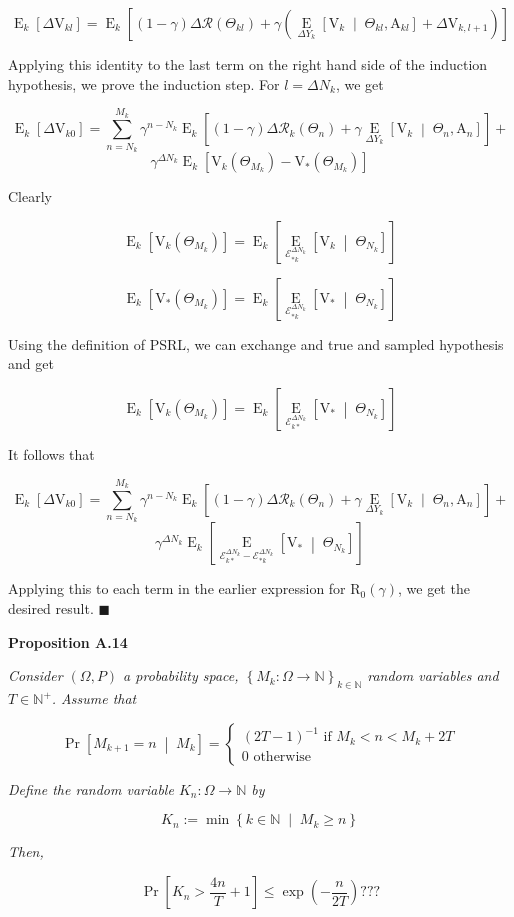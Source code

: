 \documentclass[a4paper]{article}
\newcommand{\Co}[1]{}
\newcommand{\AP}[1]{\left(#1\right)}
\newcommand{\AB}[1]{\left[#1\right]}
\newcommand{\AC}[1]{\left\{#1\right\}}
\newcommand{\ABM}[2]{\left[#1\;\middle\vert\;#2\right]}
\newcommand{\ACM}[2]{\left\{#1\;\middle\vert\;#2\right\}}
\newcommand{\Pa}[2]{\underset{#1}{\operatorname{Pr}}\AB{#2}}
\newcommand{\CP}[3]{\underset{#1}{\operatorname{Pr}}\ABM{#2}{#3}}
\newcommand{\CE}[3]{\underset{#1}{\operatorname{E}}\ABM{#2}{#3}}
\newcommand{\Nats}{\mathbb{N}}
\newcommand{\R}{\mathcal{R}}
\newcommand{\V}{\mathrm{V}}
\newcommand{\Reg}{\mathrm{R}}
\newcommand{\SHy}{Y}
\newcommand{\AT}{\mathrm{A}}
\newcommand{\Ev}{\mathcal{E}}
\newcommand{\ET}{N}
\newcommand{\IT}{M}
\newcommand{\TE}[1]{{\operatorname{E}_k}\AB{#1}}
\begin{document}
$$\TE{\Delta\V_{kl}}=\TE{(1-\gamma)\Delta\R\AP{\Theta_{kl}}+\gamma\AP{\CE{\Delta\SHy_k}{\V_k}{\Theta_{kl},\AT_{kl}}+\Delta\V_{k,l+1}}}$$

Applying this identity to the last term on the right hand side of the induction hypothesis, we prove the induction step. For $l=\Delta\ET_k$, we get

$$\TE{\Delta\V_{k0}}=\sum_{n=\ET_k}^{\IT_k}\gamma^{n-\ET_k}\TE{(1-\gamma)\Delta\R_k\AP{\Theta_n}+\gamma\CE{\Delta\SHy_k}{\V_{k}}{\Theta_n,\AT_n}}+$$
$$\gamma^{\Delta\ET_k}\TE{\V_k\AP{\Theta_{\IT_k}}-\V_*\AP{\Theta_{\IT_k}}}$$

Clearly

$$\TE{\V_k\AP{\Theta_{\IT_k}}}=\TE{\CE{\Ev_{*k}^{\Delta\ET_k}}{\V_k}{\Theta_{\ET_k}}}$$

$$\TE{\V_*\AP{\Theta_{\IT_k}}}=\TE{\CE{\Ev_{*k}^{\Delta\ET_k}}{\V_*}{\Theta_{\ET_k}}}$$

Using the definition of PSRL, we can exchange and true and sampled hypothesis and get

$$\TE{\V_k\AP{\Theta_{\IT_k}}}=\TE{\CE{\Ev_{k*}^{\Delta\ET_k}}{\V_*}{\Theta_{\ET_k}}}$$

It follows that

$$\TE{\Delta\V_{k0}}=\sum_{n=\ET_k}^{\IT_k}\gamma^{n-\ET_k}\TE{(1-\gamma)\Delta\R_k\AP{\Theta_n}+\gamma\CE{\Delta\SHy_k}{\V_{k}}{\Theta_n,\AT_n}}+$$
$$\gamma^{\Delta\ET_k}\TE{\CE{\Ev_{k*}^{\Delta\ET_k}-\Ev_{*k}^{\Delta\ET_k}}{\V_*}{\Theta_{\ET_k}}}$$

Applying this to each term in the earlier expression for $\Reg_0(\gamma)$, we get the desired result. $\blacksquare$

\textbf{Proposition A.14}\Co{b}

\textit{Consider $(\Omega,P)$ a probability space, $\AC{M_k:\Omega\rightarrow\Nats}_{k\in\Nats}$ random variables and $T\in\Nats^+$. Assume that}\Co{i}

$$\CP{}{M_{k+1}=n}{M_k}=\begin{cases} \AP{2T-1}^{-1} \text{ if } M_k < n < M_k+2T\\ 0 \text{ otherwise} \end{cases}$$

\textit{Define the random variable $K_n:\Omega\rightarrow\Nats$ by}\Co{i}

$$K_n:=\min\ACM{k\in\Nats}{M_k\geq n}$$

\textit{Then,}\Co{i}

$$\Pa{}{K_n>\frac{4n}{T}+1}\leq\exp\AP{-\frac{n}{2T}}???$$
\end{document}
